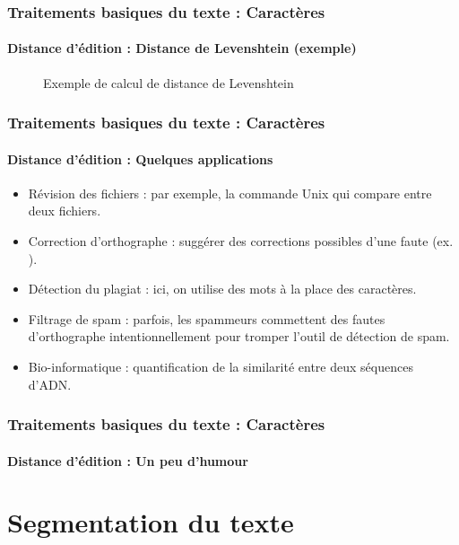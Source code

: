 \documentclass[xcolor=table]{beamer}
\begin{document}
\begin{frame}
\frametitle{Traitements basiques du texte : Caractères}
\framesubtitle{Distance d'édition : Distance de Levenshtein (exemple)}

\begin{figure}
	\centering
	\caption{Exemple de calcul de distance de Levenshtein \cite{2019-jurafsky-martin}}
\end{figure}

\end{frame}

\begin{frame}
\frametitle{Traitements basiques du texte : Caractères}
\framesubtitle{Distance d'édition : Quelques applications}

\begin{itemize}
	\item Révision des fichiers : par exemple, la commande Unix  qui compare entre deux fichiers.
	\item Correction d'orthographe : suggérer des corrections possibles d'une faute (ex. ).
	\item Détection du plagiat : ici, on utilise des mots à la place des caractères.
	\item Filtrage de spam : parfois, les spammeurs commettent des fautes d'orthographe intentionnellement pour tromper l'outil de détection de spam.
	\item Bio-informatique : quantification de la similarité entre deux séquences d'ADN.
\end{itemize}

\end{frame}

\begin{frame}
\frametitle{Traitements basiques du texte : Caractères}
\framesubtitle{Distance d'édition : Un peu d'humour}

\begin{center}
\end{center}

\end{frame}

\section{Segmentation du texte}
\end{document}
